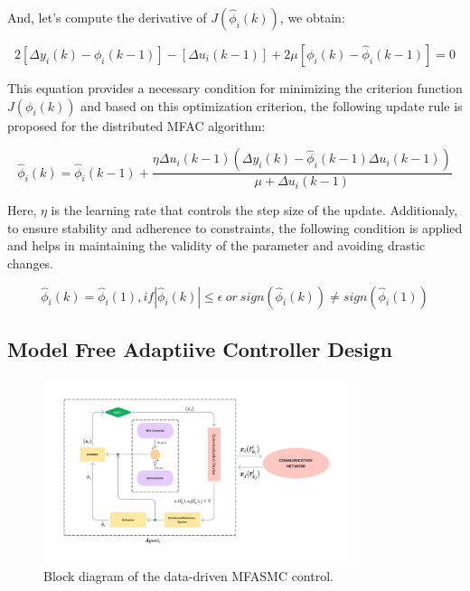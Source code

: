 \documentclass[journal,onecolumn]{IEEEtran}
\begin{document}
And, let's compute the derivative of \( J(\hat{\phi}_i(k)) \), we obtain:

\begin{equation}
    \label{model 6}
    2 [ \Delta y_i(k) - \phi_i(k-1)] - [\Delta u_i(k-1)] + 2 \mu [\phi_i(k) -  \hat{\phi}_i(k-1)] = 0
\end{equation}

This equation provides a necessary condition for minimizing the criterion function \(J(\phi_i(k))\) and based on this optimization criterion, the following update rule is proposed for the distributed MFAC algorithm:

\begin{equation}
    \label{model eq:ppd_parameter}
    \hat{\phi}_i(k) = \hat{\phi}_i(k-1) + \frac{\eta \Delta u_i(k-1) (\Delta y_i(k) - \hat{\phi}_i(k-1) \Delta u_i(k-1))}{\mu + \Delta u_i(k-1)}
\end{equation}

Here, $\eta$ is the learning rate that controls the step size of the update.
Additionaly, to ensure stability and adherence to constraints, the following condition is applied and helps in maintaining the validity of the parameter and avoiding drastic changes. 

\begin{equation}
    \label{model 8}
    \hat{\phi}_i(k) = \hat{\phi}_i(1), if |\hat{\phi}_i(k) | \leq \epsilon \ or \ sign(\hat{\phi}_i(k)) \neq  sign(\hat{\phi}_i(1))
\end{equation}

\subsection{Model Free Adaptiive Controller Design}

\begin{figure}[h!]
    \centering
    \includegraphics[width=0.8\textwidth]{diagram.png}
    \caption{Block diagram of the data-driven MFASMC control.}
    \label{fig:diagram} %
\end{figure}
\end{document}
